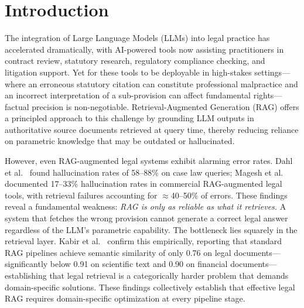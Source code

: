 \documentclass[sn-mathphys,Numbered]{sn-jnl}%
\begin{document}
\maketitle
\section{Introduction}
\label{sec:intro}

The integration of Large Language Models (LLMs) into legal practice has
accelerated dramatically, with AI-powered tools now assisting practitioners
in contract review, statutory research, regulatory compliance checking, and
litigation support.  Yet for these tools to be deployable in
high-stakes settings---where an erroneous statutory citation can constitute
professional malpractice and an incorrect interpretation of a sub-provision
can affect fundamental rights---factual precision is non-negotiable.
Retrieval-Augmented Generation (RAG) \cite{lewis2021retrievalaugmentedgenerationknowledgeintensivenlp} offers a
principled approach to this challenge by grounding LLM outputs in
authoritative source documents retrieved at query time, thereby reducing
reliance on parametric knowledge that may be outdated or hallucinated.

However, even RAG-augmented legal systems exhibit alarming error rates.
Dahl et al.~\cite{10.1093/jla/laae003} found hallucination rates of 58--88\% on case law
queries; Magesh et al.~\cite{magesh2024hallucinationfreeassessingreliabilityleading} documented 17--33\% hallucination
rates in commercial RAG-augmented legal tools, with retrieval failures
accounting for $\approx$40--50\% of errors.  These findings reveal a
fundamental weakness: \emph{RAG is only as reliable as what it retrieves.}
A system that fetches the wrong provision cannot generate a correct legal
answer regardless of the LLM's parametric capability.  The bottleneck lies
squarely in the retrieval layer.  Kabir et al.~\cite{kabir2025legalraghybridragmultilingual} confirm this
empirically, reporting that standard RAG pipelines achieve semantic
similarity of only 0.76 on legal documents---significantly below 0.91 on
scientific text and 0.90 on financial documents---establishing that legal
retrieval is a categorically harder problem that demands domain-specific
solutions.  These findings collectively establish that effective legal RAG
requires domain-specific optimization at every pipeline stage.
\end{document}
